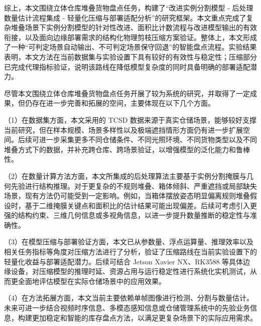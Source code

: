 综上，本文围绕立体仓库堆叠货物盘点任务，构建了“改进实例分割模型 - 后处理数量估计流程集成 - 轻量化压缩与部署适配分析”的研究框架。本文重点完成了复杂堆叠场景下实例分割模型的针对性改进、面积比计数流程与改进模型输出的有效衔接，以及面向边缘部署需求的结构化物理剪枝压缩方案验证。整体上，本文形成了一种“可判定场景自动输出、不可判定场景保守回退”的智能盘点流程。实验结果表明，本文方法在当前数据集与实验设置下具有较好的有效性与稳定性；压缩部分已完成代理指标验证，说明该路线在降低模型复杂度的同时具备明确的部署适配潜力。

尽管本文围绕立体仓库堆叠货物盘点任务开展了较为系统的研究，并取得了一定成果，但仍存在进一步完善和拓展的空间，主要体现在以下几个方面。

\par\noindent
（1）在数据集方面，本文采用的 TCSD 数据来源于真实仓储场景，能够较好支撑当前研究，但在样本规模、场景多样性以及极端遮挡情形方面仍有进一步扩展空间。后续可进一步采集更多不同仓储条件、不同光照环境、不同货物类型以及不同堆叠方式下的数据，并补充跨仓库、跨场景验证，以增强模型的泛化能力和鲁棒性。

\par\noindent
（2）在数量计算方法方面，本文所集成的后处理算法主要基于实例分割掩膜与几何先验进行结构推理。对于更复杂的不规则堆叠、箱体倾斜、严重遮挡或局部缺失场景，现有方法仍可能受到一定影响。例如，当箱体摆放姿态明显偏离规则堆叠假设时，基于二维掩膜关键点和面积比的估计结果可能出现偏差。后续可考虑引入更强的结构约束、三维几何信息或多视角信息，以进一步提升数量推断的稳定性与准确性。

\par\noindent
（3）在模型压缩与部署验证方面，本文已从参数量、浮点运算量、推理效率以及相关任务指标等角度对压缩方法进行了分析，验证了压缩路线在当前实验设置下的轻量化收益与部署适配潜力。后续可结合 Jetson Xavier NX、RK3588 等具体边缘设备，对压缩模型的推理时延、资源占用与运行稳定性进行系统化实机测试，从而更全面地评估模型在实际仓储场景中的应用效果。

\par\noindent
（4）在方法拓展方面，本文当前主要依赖单帧图像进行检测、分割与数量估计。未来可进一步结合视频时序信息、多模态感知信息或仓储管理系统中的先验业务信息，构建更加稳定和智能的库存盘点方法，以满足更复杂场景下的实际应用需求。
